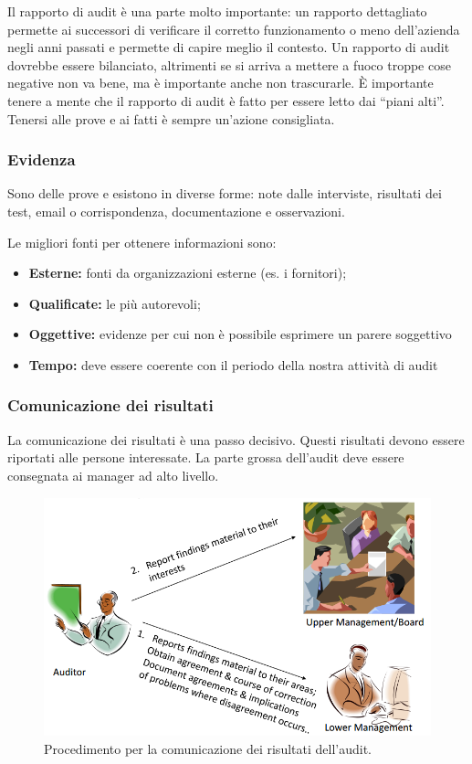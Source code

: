 Il rapporto di audit è una parte molto importante: un rapporto dettagliato
permette ai successori di verificare il corretto funzionamento o meno
dell'azienda negli anni passati e permette di capire meglio il contesto. Un
rapporto di audit dovrebbe essere bilanciato, altrimenti se si arriva a mettere
a fuoco troppe cose negative non va bene, ma è importante anche non trascurarle.
È importante tenere a mente che il rapporto di audit è fatto per essere letto
dai ``piani alti''. Tenersi alle prove e ai fatti è sempre un'azione
consigliata.

\subsubsection{Evidenza}

Sono delle prove e esistono in diverse forme: note dalle interviste, risultati
dei test, email o corrispondenza, documentazione e osservazioni.

Le migliori fonti per ottenere informazioni sono:
\begin{itemize}
\item \textbf{Esterne:} fonti da organizzazioni esterne (es. i fornitori);
\item \textbf{Qualificate:} le più autorevoli;
\item \textbf{Oggettive:} evidenze per cui non è possibile esprimere un
parere soggettivo
\item \textbf{Tempo:} deve essere coerente con il periodo della nostra attività
di audit
\end{itemize}

\subsubsection{Comunicazione dei risultati}

La comunicazione dei risultati è una passo decisivo. Questi risultati devono
essere riportati alle persone interessate.
La parte grossa dell'audit deve essere consegnata ai manager ad alto
livello.

\begin{figure}[h!]
        \begin{center}
                \includegraphics[scale=0.4]{res/img/communication_audit.png}
        \end{center}
        \caption{Procedimento per la comunicazione dei risultati dell'audit.}
\end{figure}


